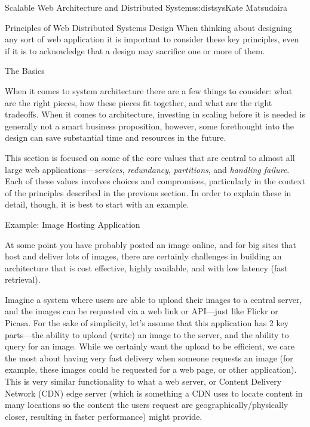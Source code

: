 \begin{aosachapter}{Scalable Web Architecture and Distributed Systems}{s:distsys}{Kate Matsudaira}
\begin{aosasect1}{Principles of Web Distributed Systems Design}
When thinking about designing any sort of web application it is
important to consider these key principles, even if it is to
acknowledge that a design may sacrifice one or more of them.

\end{aosasect1}

\begin{aosasect1}{The Basics}

When it comes to system architecture there are a few things to
consider: what are the right pieces, how these pieces fit together,
and what are the right tradeoffs. When it comes to architecture,
investing in scaling before it is needed is generally not a smart
business proposition, however, some forethought into the design can
save substantial time and resources in the future.

This section is focused on some of the core values that are central to
almost all large web applications---\emph{services},
\emph{redundancy}, \emph{partitions}, and \emph{handling
failure}. Each of these values involves choices and compromises,
particularly in the context of the principles described in the
previous section. In order to explain these in detail, though, it is
best to start with an example.

\begin{aosasect2}{Example: Image Hosting Application}

At some point you have probably posted an image online, and for big
sites that host and deliver lots of images, there are certainly
challenges in building an architecture that is cost effective, highly
available, and with low latency (fast retrieval).

Imagine a system where users are able to upload their images to a
central server, and the images can be requested via a web link or
API---just like Flickr or Picasa. For the sake of simplicity, let’s
assume that this application has 2 key parts---the ability to upload
(write) an image to the server, and the ability to query for an
image. While we certainly want the upload to be efficient, we care the
most about having very fast delivery when someone requests an image
(for example, these images could be requested for a web page, or other
application). This is very similar functionality to what a web server,
or Content Delivery Network (CDN) edge server (which is something a
CDN uses to locate content in many locations so the content the users
request are geographically/physically closer, resulting in faster
performance) might provide.


\end{aosasect2}
\end{aosasect1}
\end{aosachapter}
